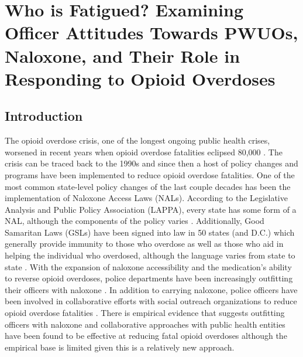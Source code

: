 \chapter{Who is Fatigued? Examining Officer Attitudes Towards PWUOs, Naloxone, and Their Role in Responding to Opioid Overdoses}


\section{Introduction}

The opioid overdose crisis, one of the longest ongoing public health crises, worsened in recent years when opioid overdose fatalities eclipsed 80,000 \parencite{center_for_disease_control_and_prevention_national_2023}. The crisis can be traced back to the 1990s and since then a host of policy changes and programs have been implemented to reduce opioid overdose fatalities. One of the most common state-level policy changes of the last couple decades has been the implementation of Naloxone Access Laws (NALs). According to the Legislative Analysis and Public Policy Association (LAPPA), every state has some form of a NAL, although the components of the policy varies \parencite{legislative_analysis_and_public_policy_association_naloxone_2022}. Additionally, Good Samaritan Laws (GSLs) have been signed into law in 50 states (and D.C.) which generally provide immunity to those who overdose as well as those who aid in helping the individual who overdosed, although the language varies from state to state \parencite{west_good_2023}. With the expansion of naloxone accessibility and the medication's ability to reverse opioid overdoses, police departments have been increasingly outfitting their officers with naloxone \parencite{lurigio_opioid_2018}. In addition to carrying naloxone, police officers have been involved in collaborative efforts with social outreach organizations to reduce opioid overdose fatalities \parencite{donnelly_law_2022, formica_characteristics_2021, yatsco_alternatives_2020}. There is empirical evidence that suggests outfitting officers with naloxone and collaborative approaches with public health entities have been found to be effective at reducing fatal opioid overdoses \parencite{donnelly_law_2022, rando_intranasal_2015} although the empirical base is limited given this is a relatively new approach.

